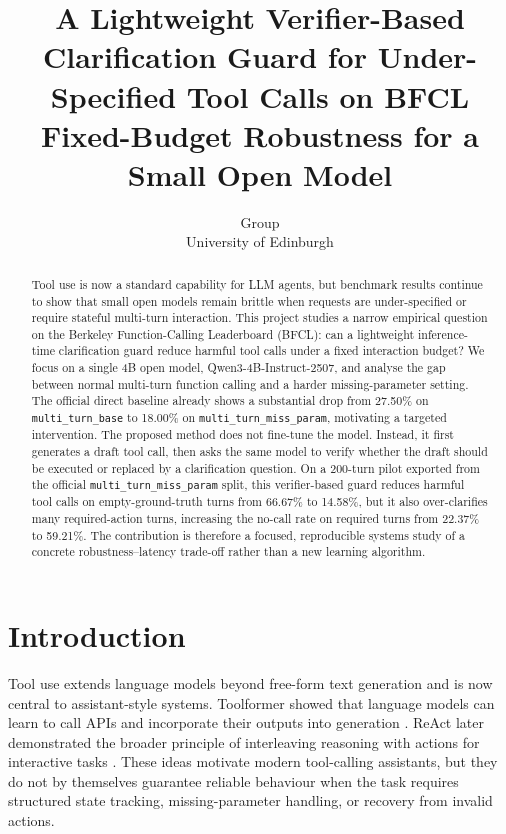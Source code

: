 \documentclass[10pt,twocolumn]{article}
\title{A Lightweight Verifier-Based Clarification Guard for Under-Specified Tool Calls on BFCL\\
\large Fixed-Budget Robustness for a Small Open Model}
\author{Group \GroupID\\
University of Edinburgh\\
\texttt{\placeholder{student numbers / names if required}}}
\date{}
\newcommand{\PrimaryModel}{Qwen3-4B-Instruct-2507}
\begin{document}
\maketitle

\begin{abstract}
Tool use is now a standard capability for LLM agents, but benchmark results continue to show that small open models remain brittle when requests are under-specified or require stateful multi-turn interaction. This project studies a narrow empirical question on the Berkeley Function-Calling Leaderboard (BFCL): can a lightweight inference-time clarification guard reduce harmful tool calls under a fixed interaction budget? We focus on a single 4B open model, \PrimaryModel{}, and analyse the gap between normal multi-turn function calling and a harder missing-parameter setting. The official direct baseline already shows a substantial drop from 27.50\% on \texttt{multi\_turn\_base} to 18.00\% on \texttt{multi\_turn\_miss\_param}, motivating a targeted intervention. The proposed method does not fine-tune the model. Instead, it first generates a draft tool call, then asks the same model to verify whether the draft should be executed or replaced by a clarification question. On a 200-turn pilot exported from the official \texttt{multi\_turn\_miss\_param} split, this verifier-based guard reduces harmful tool calls on empty-ground-truth turns from 66.67\% to 14.58\%, but it also over-clarifies many required-action turns, increasing the no-call rate on required turns from 22.37\% to 59.21\%. The contribution is therefore a focused, reproducible systems study of a concrete robustness--latency trade-off rather than a new learning algorithm.
\end{abstract}

\section{Introduction}
Tool use extends language models beyond free-form text generation and is now central to assistant-style systems. Toolformer showed that language models can learn to call APIs and incorporate their outputs into generation \citep{schick2023toolformer}. ReAct later demonstrated the broader principle of interleaving reasoning with actions for interactive tasks \citep{yao2023react}. These ideas motivate modern tool-calling assistants, but they do not by themselves guarantee reliable behaviour when the task requires structured state tracking, missing-parameter handling, or recovery from invalid actions.
\end{document}
